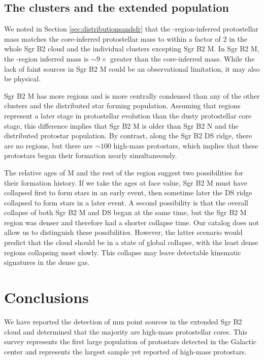 \documentclass[twocolumn]{aastex61}
\begin{document}
\subsection{The clusters and the extended population}
\label{sec:clustersandextended}
We noted in Section \ref{sec:distributionsandsfr} that the \hii-region-inferred
protostellar mass matches the core-inferred protostellar mass to within a
factor of 2 in the whole Sgr B2 cloud and the individual clusters excepting Sgr
B2 M.  In Sgr B2 M, the \hii-region inferred mass is $\sim9\times$ greater than
the core-inferred mass.  While the lack of faint sources in Sgr B2 M could
be an observational limitation, it may also be physical.

Sgr B2 M has more \hii regions and is more centrally condensed than any of the
other clusters and the distributed star forming population.  Assuming that \hii
regions represent a later stage in protostellar evolution than the dusty
protostellar core stage, this difference implies that Sgr B2 M is older than
Sgr B2 N and the distributed protostar population.  By contrast, along the Sgr
B2 DS ridge, there are no \hii regions, but there are $\sim100$ high-mass
protostars, which implies that these protostars began their formation nearly
simultaneously.

The relative ages of M and the rest of the region suggest two possibilities for
their formation history.  If we take the ages at face value, Sgr B2 M must have
collapsed first to form stars in an early event, then sometime later the DS
ridge collapsed to form stars in a later event.  A second possibility is that
the overall collapse of both Sgr B2 M and DS began at the same time, but the
Sgr B2 M region was denser and therefore had a shorter collapse time.  Our
catalog does not allow us to distinguish these possibilities.  However, the
latter scenario would predict that the cloud should be in a state of global
collapse, with the least dense regions collapsing most slowly.  This collapse
may leave detectable kinematic signatures in the dense gas.

\section{Conclusions}
We have reported the detection of  mm point sources in the extended
Sgr B2 cloud and determined that the majority are high-mass protostellar
cores.  This survey represents the first large population of protostars
detected in the Galactic center and represents the largest sample yet reported
of high-mass protostars.
\end{document}
